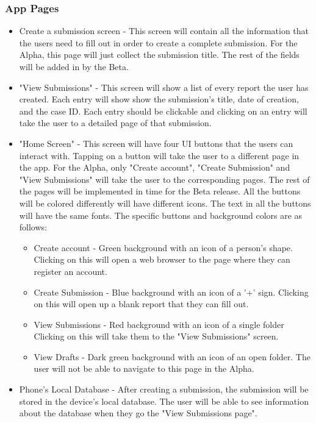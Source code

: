 \documentclass[onecolumn, draftclsnofoot,10pt, compsoc]{IEEEtran}
\begin{document}
\subsubsection{App Pages}
\begin{itemize}
\item Create a submission screen - This screen will contain all the information that the users need to fill out in order to create a complete submission. For the Alpha, this page will just collect the submission title. The rest of the fields will be added in by the Beta.


\item "View Submissions" - This screen will show a list of every report the user has created.  Each entry will show show the submission's title,  date of creation, and the case ID. Each entry should be clickable and clicking on an entry will take the user to a detailed page of that submission.

\item "Home Screen" - This screen will have four UI buttons that the users can interact with. Tapping on a button will take the user to a different page in the app. For the Alpha, only "Create account", "Create Submission" and "View Submissions" will take the user to the corresponding pages. The rest of the pages will be implemented in time for the Beta release. All the buttons will be colored differently will have different icons. The text in all the buttons will have the same fonts.  The specific buttons and background colors are as follows:

\begin{itemize}
\item Create account - Green background with an icon of a person's shape. Clicking on this will open a web browser to the page where they can register an account.
\item Create Submission - Blue background with an icon of a '+' sign. Clicking on this will open up a blank report that they can fill out.
\item View Submissions - Red background with an icon of a single folder Clicking on this will take them to the "View Submissions" screen.
\item View Drafts - Dark green background with an icon of an open folder. The user will not be able to navigate to this page in the Alpha.
\end{itemize}


\item Phone's Local Database - After creating a submission, the submission will be stored in the device's local database. The user will be able to see information about the database when they go the "View Submissions page".


\end{itemize}
\end{document}
